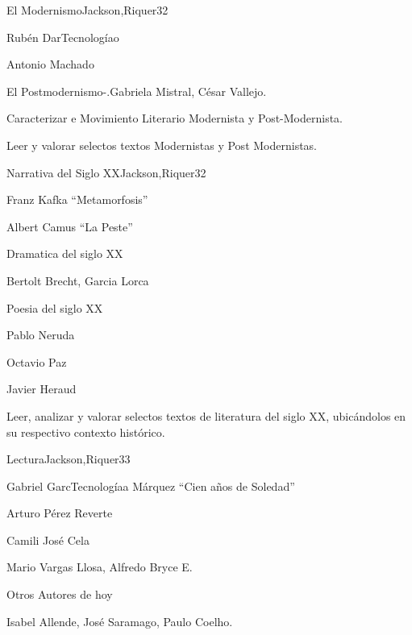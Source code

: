 \begin{syllabus}
\begin{unit}{El Modernismo}{Jackson,Riquer}{3}{2}
\begin{topics}
	\item Rubén DarTecnologíao
	\item Antonio Machado
	\item El Postmodernismo-.Gabriela Mistral, César Vallejo.
\end{topics}
\begin{learningoutcomes}
	\item Caracterizar e Movimiento Literario Modernista y Post-Modernista.
	\item Leer y valorar selectos textos Modernistas y Post Modernistas.
\end{learningoutcomes}
\end{unit}

\begin{unit}{Narrativa del Siglo XX}{Jackson,Riquer}{3}{2}
\begin{topics}
	\item Franz Kafka ``Metamorfosis''
	\item Albert Camus ``La Peste''
	\item Dramatica del siglo XX
	\item Bertolt Brecht, Garcia Lorca
	\item Poesia del siglo XX
	\item Pablo Neruda
	\item Octavio Paz
	\item Javier Heraud
\end{topics}
\begin{learningoutcomes}
	\item Leer, analizar y valorar selectos textos de literatura del siglo XX, ubicándolos en su respectivo contexto histórico.
\end{learningoutcomes}
\end{unit}

\begin{unit}{Lectura}{Jackson,Riquer}{3}{3}
\begin{topics}
	\item Gabriel GarcTecnologíaa Márquez ``Cien años de Soledad''
	\item Arturo Pérez Reverte
	\item Camili José Cela
	\item Mario Vargas Llosa, Alfredo Bryce E.
	\item Otros Autores de hoy
	\item Isabel Allende, José Saramago, Paulo Coelho.
\end{topics}
\end{unit}



\begin{coursebibliography}
\end{coursebibliography}
\end{syllabus}
